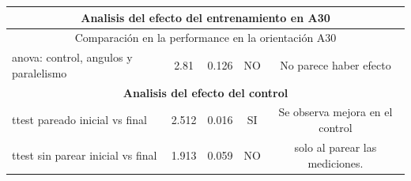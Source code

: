 \documentclass{article}
\begin{document}
\begin{table}
\begin{center}
\begin{tabular}{lcccc}
\midrule
\multicolumn{5}{c}{ \textbf{Analisis del efecto del entrenamiento en A30}} \\
\midrule
\midrule
\multicolumn{5}{c}{Comparación en la performance en la orientación A30} \\
\midrule
anova: control, angulos y paralelismo & 2.81 & 0.126 & NO & No parece haber efecto \\

\midrule
\multicolumn{5}{c}{ \textbf{Analisis del efecto del control}} \\
\midrule
ttest pareado inicial vs final & 2.512 & 0.016 & SI & Se observa mejora en el control\\
ttest sin parear inicial vs final & 1.913 & 0.059 & NO & solo al parear las mediciones. \\

\bottomrule
\end{tabular}

\end{center}
\end{table}
\end{document}
